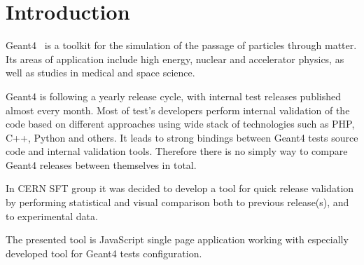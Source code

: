 \section{Introduction}
\label{sec-introduction}
Geant4~\cite{Geant4} is a toolkit for the simulation of the passage of particles through matter. Its areas of application include high energy, nuclear and accelerator physics, as well as studies in medical and space science. 

Geant4 is following a yearly release cycle, with internal test releases published almost every month.
Most of test's developers perform internal validation of the code based on different approaches using wide stack of technologies such as PHP, C++, Python and others.
It leads to strong bindings between Geant4 tests source code and internal validation tools.
Therefore there is no simply way to compare Geant4 releases between themselves in total.

In CERN SFT group it was decided to develop a tool for quick release validation by performing statistical and visual comparison both to previous release(s), and to experimental data. 

The presented tool is JavaScript single page application working with especially developed tool for Geant4 tests configuration.
